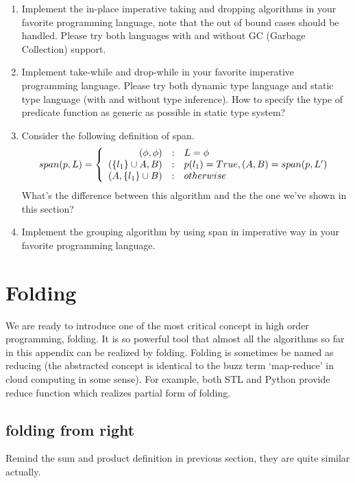 \documentclass[b5paper]{article}
\begin{document}
\begin{Exercise}
\begin{enumerate}
\item Implement the in-place imperative taking and dropping algorithms in your favorite programming language, note that
the out of bound cases should be handled. Please try both languages with and without GC (Garbage Collection) support.
\item Implement take-while and drop-while in your favorite imperative programming language. Please try both dynamic
type language and static type language (with and without type inference). How to specify the type of predicate function
as generic as possible in static type system?
\item Consider the following definition of span.
\[
span(p, L) =  \left \{
  \begin{array}
  {r@{\quad:\quad}l}
  (\phi, \phi) & L = \phi \\
  (\{ l_1 \} \cup A, B) & p(l_1) = True, (A, B) = span(p, L') \\
  (A, \{l_1\} \cup B) & otherwise
  \end{array}
\right.
\]
What's the difference between this algorithm and the the one we've shown in this section?
\item Implement the grouping algorithm by using span in imperative way in your favorite programming language.
\end{enumerate}
\end{Exercise}

\section{Folding}

We are ready to introduce one of the most critical concept in high order programming, folding. It is so powerful tool
that almost all the algorithms so far in this appendix can be realized by folding. Folding is sometimes be named as
reducing (the abstracted concept is identical to the buzz term `map-reduce' in cloud computing in some sense). For example,
both STL and Python provide reduce function which realizes partial form of folding.

\subsection{folding from right}
Remind the sum and product definition in previous section, they are quite similar actually.
\end{document}

